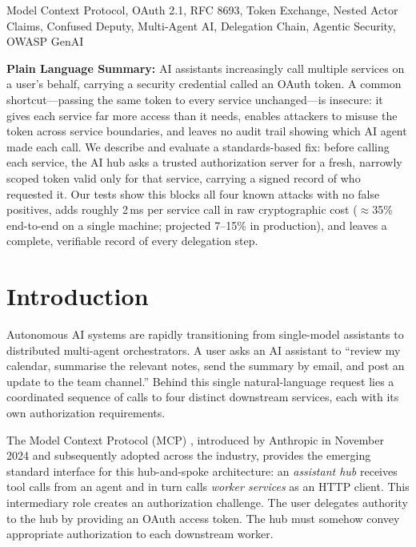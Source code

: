 \documentclass[journal]{IEEEtran}
\begin{document}
\begin{IEEEkeywords}
Model Context Protocol, OAuth 2.1, RFC 8693, Token Exchange, Nested Actor Claims,
Confused Deputy, Multi-Agent AI, Delegation Chain, Agentic Security, OWASP GenAI
\end{IEEEkeywords}

\begin{IEEEkeywords}
\textbf{Plain Language Summary:}
AI assistants increasingly call multiple services on a user's behalf, carrying
a security credential called an OAuth token. A common shortcut---passing the same
token to every service unchanged---is insecure: it gives each service far more
access than it needs, enables attackers to misuse the token across service
boundaries, and leaves no audit trail showing which AI agent made each call.
We describe and evaluate a standards-based fix: before calling each service, the
AI hub asks a trusted authorization server for a fresh, narrowly scoped token
valid only for that service, carrying a signed record of who requested it.
Our tests show this blocks all four known attacks with no false positives,
adds roughly 2\,ms per service call in raw cryptographic cost ($\approx$35\%
end-to-end on a single machine; projected 7--15\% in production), and leaves a
complete, verifiable record of every delegation step.
\end{IEEEkeywords}

\section{Introduction}
\label{sec:introduction}

Autonomous AI systems are rapidly transitioning from single-model assistants to
distributed multi-agent orchestrators. A user asks an AI assistant to
``review my calendar, summarise the relevant notes, send the summary by email, and
post an update to the team channel.'' Behind this single natural-language request
lies a coordinated sequence of calls to four distinct downstream services, each
with its own authorization requirements.

The Model Context Protocol (MCP) \cite{mcp_spec,mcp_wiki}, introduced by Anthropic in
November 2024 and subsequently adopted across the industry, provides the emerging
standard interface for this hub-and-spoke architecture: an \textit{assistant hub}
receives tool calls from an agent and in turn calls \textit{worker services} as
an HTTP client. This intermediary role creates an authorization challenge. The
user delegates authority to the hub by providing an OAuth access token. The hub
must somehow convey appropriate authorization to each downstream worker.
\end{document}

